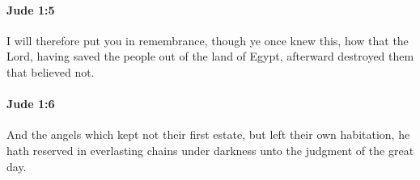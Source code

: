		\paragraph{Jude 1:5} %
			\label{JUDE-1-5}

			I will therefore put you in remembrance, though ye once knew this, how that the Lord, having saved the people out of the land of Egypt, afterward destroyed them that believed not.

			\begin{framed}
			\scriptsize
				\begin{compactdesc}
					\item[SBLG] 
				\end{compactdesc}
			\end{framed}

		\paragraph{Jude 1:6} %
			\label{JUDE-1-6}

			And the angels which kept not their first estate, but left their own habitation, he hath reserved in everlasting chains under darkness unto the judgment of the great day.

